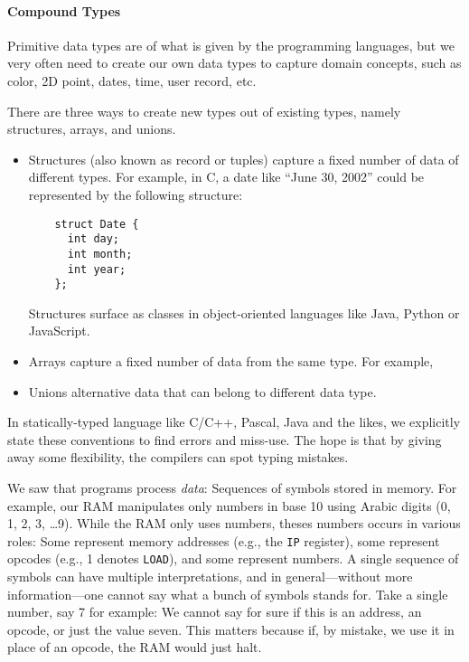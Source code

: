 \documentclass{aldast}
\begin{document}
\paragraph{Compound Types}

Primitive data types are of what is given by the programming
languages, but we very often need to create our own data types to
capture domain concepts, such as color, 2D point, dates, time, user
record, etc.

There are three ways to create new types out of existing types, namely
structures, arrays, and unions.
\begin{itemize}
\item Structures (also known as record or tuples) capture a fixed
  number of data of different types. For example, in C, a date like
  ``June 30, 2002'' could be represented by the following structure:
  \begin{verbatim}
    struct Date {
      int day;
      int month;
      int year;
    };
  \end{verbatim}
  Structures surface as classes in object-oriented languages like
  Java, Python or JavaScript.
\item Arrays capture a fixed number of data from the same
  type. For example, 
\item Unions alternative data that can belong to different data
  type.
\end{itemize}



In statically-typed language like C/C++, Pascal, Java and the likes,
we explicitly state these conventions to find errors and
miss-use. The hope is that by giving away some flexibility, the compilers can spot
typing mistakes.


We saw that programs process \emph{data}: Sequences of symbols stored
in memory. For example, our RAM manipulates only numbers in base 10
using Arabic digits (0, 1, 2, 3, \ldots 9). While the RAM only uses
numbers, theses numbers occurs in various roles: Some represent memory
addresses (e.g., the \texttt{IP} register), some represent opcodes
(e.g., 1 denotes \texttt{LOAD}), and some represent numbers. A single
sequence of symbols can have multiple interpretations, and in
general---without more information---one cannot say what a bunch of
symbols stands for. Take a single number, say 7 for example: We cannot say
for sure if this is an address, an opcode, or just the value
seven. This matters because if, by mistake, we use it in place of an
opcode, the RAM would just halt.
\end{document}
